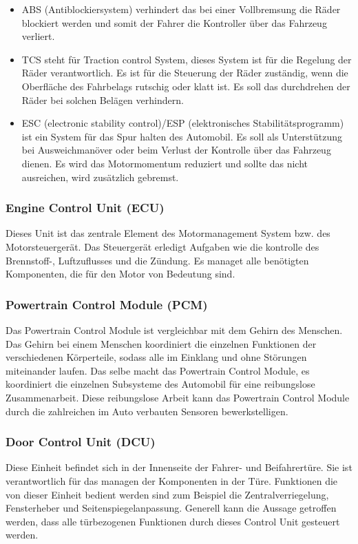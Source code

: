         \begin{itemize}
            \item ABS (Antiblockiersystem) verhindert das bei einer Vollbremsung die Räder
            blockiert werden und somit der Fahrer die Kontroller über das Fahrzeug verliert.

            \item TCS steht für Traction control System, dieses System ist für die Regelung der Räder
            verantwortlich. Es ist für die Steuerung der Räder zuständig, wenn die Oberfläche des Fahrbelags
            rutschig oder klatt ist. Es soll das durchdrehen der Räder bei solchen Belägen verhindern.

            \item ESC (electronic stability control)/ESP (elektronisches Stabilitätsprogramm) ist ein System
            für das Spur halten des Automobil. Es soll als Unterstützung bei Ausweichmanöver oder beim Verlust
            der Kontrolle über das Fahrzeug dienen. Es wird das Motormomentum reduziert und sollte das nicht
            ausreichen, wird zusätzlich gebremst.
        \end{itemize}

        \subsubsection{Engine Control Unit (ECU)}
        Dieses Unit ist das zentrale Element des Motormanagement System bzw. des Motorsteuergerät. Das Steuergerät
        erledigt Aufgaben wie die kontrolle des Brennstoff-, Luftzuflusses und die Zündung. Es managet alle
        benötigten Komponenten, die für den Motor von Bedeutung sind.

        \subsubsection{Powertrain Control Module (PCM)}
        Das Powertrain Control Module ist vergleichbar mit dem Gehirn des Menschen. Das Gehirn bei einem Menschen
        koordiniert die einzelnen Funktionen der verschiedenen Körperteile, sodass alle im Einklang und ohne
        Störungen miteinander laufen. Das selbe macht das Powertrain Control Module, es koordiniert die einzelnen
        Subsysteme des Automobil für eine reibungslose Zusammenarbeit. Diese reibungslose Arbeit kann das Powertrain
        Control Module durch die zahlreichen im Auto verbauten Sensoren bewerkstelligen.

        \subsubsection{Door Control Unit (DCU)}
        Diese Einheit befindet sich in der Innenseite der Fahrer- und Beifahrertüre. Sie ist verantwortlich für das
        managen der Komponenten in der Türe. Funktionen die von dieser Einheit bedient werden sind zum Beispiel die
        Zentralverriegelung, Fensterheber und Seitenspiegelanpassung. Generell kann die Aussage getroffen werden,
        dass alle türbezogenen Funktionen durch dieses Control Unit gesteuert werden.

